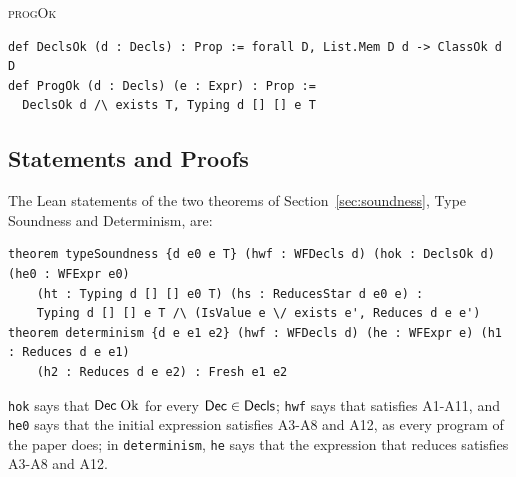 \begin{cmp}{\textsc{progOk}}
\begin{paperside}
\end{paperside}
\begin{leanside}
\begin{lstlisting}[style=leanside]
def DeclsOk (d : Decls) : Prop := forall D, List.Mem D d -> ClassOk d D
def ProgOk (d : Decls) (e : Expr) : Prop :=
  DeclsOk d /\ exists T, Typing d [] [] e T
\end{lstlisting}
\end{leanside}
\end{cmp}

\subsection{Statements and Proofs}
\label{app:lean:statements}
The Lean statements of the two theorems of Section~\ref{sec:soundness}, Type Soundness and Determinism, are:
\begin{lstlisting}[language=lean,basicstyle=\scriptsize\ttfamily]
theorem typeSoundness {d e0 e T} (hwf : WFDecls d) (hok : DeclsOk d) (he0 : WFExpr e0)
    (ht : Typing d [] [] e0 T) (hs : ReducesStar d e0 e) :
    Typing d [] [] e T /\ (IsValue e \/ exists e', Reduces d e e')
theorem determinism {d e e1 e2} (hwf : WFDecls d) (he : WFExpr e) (h1 : Reduces d e e1)
    (h2 : Reduces d e e2) : Fresh e1 e2
\end{lstlisting}
\texttt{hok} says that $\mathsf{Dec}\mskip5mu\mathrm{Ok}$ for every $\mathsf{Dec}\in\mathsf{Decls}$; \texttt{hwf} says that \decls satisfies A1-A11, and \texttt{he0} says that the initial expression satisfies A3-A8 and A12, as every program of the paper does; in \texttt{determinism}, \texttt{he} says that the expression that reduces satisfies A3-A8 and A12.

